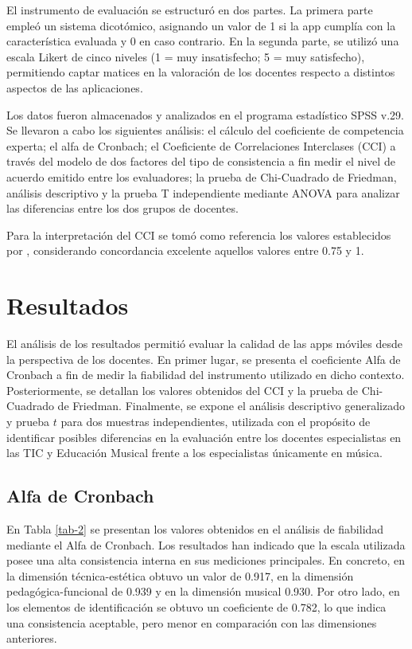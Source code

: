 \documentclass[spanish]{textolivre}
\begin{document}
El instrumento de evaluación se estructuró en dos partes. La primera parte empleó un sistema dicotómico, asignando un valor de 1 si la app cumplía con la característica evaluada y 0 en caso contrario. En la segunda parte, se utilizó una escala Likert de cinco niveles (1 = muy insatisfecho; 5 = muy satisfecho), permitiendo captar matices en la valoración de los docentes respecto a distintos aspectos de las aplicaciones.

Los datos fueron almacenados y analizados en el programa estadístico SPSS v.29. Se llevaron a cabo los siguientes análisis: el cálculo del coeficiente de competencia experta; el alfa de Cronbach; el Coeficiente de Correlaciones Interclases (CCI) a través del modelo de dos factores del tipo de consistencia a fin medir el nivel de acuerdo emitido entre los evaluadores; la prueba de Chi-Cuadrado de Friedman, análisis descriptivo y la prueba T independiente mediante ANOVA para analizar las diferencias entre los dos grupos de docentes.

Para la interpretación del CCI se tomó como referencia los valores establecidos por \textcite{martinez-perez2023}, considerando concordancia excelente aquellos valores entre 0.75 y 1.

\section{Resultados}\label{sec-resultados}
El análisis de los resultados permitió evaluar la calidad de las apps móviles desde la perspectiva de los docentes. En primer lugar, se presenta el coeficiente Alfa de Cronbach a fin de medir la fiabilidad del instrumento utilizado en dicho contexto. Posteriormente, se detallan los valores obtenidos del CCI y la prueba de Chi-Cuadrado de Friedman. Finalmente, se expone el análisis descriptivo generalizado y prueba $t$ para dos muestras independientes, utilizada con el propósito de identificar posibles diferencias en la evaluación entre los docentes especialistas en las TIC y Educación Musical frente a los especialistas únicamente en música.

\subsection{Alfa de Cronbach}\label{sec-3_1}
En Tabla \ref{tab-2} se presentan los valores obtenidos en el análisis de fiabilidad mediante el Alfa de Cronbach. Los resultados han indicado que la escala utilizada posee una alta consistencia interna en sus mediciones principales. En concreto, en la dimensión técnica-estética obtuvo un valor de 0.917, en la dimensión pedagógica-funcional de 0.939 y en la dimensión musical 0.930. Por otro lado, en los elementos de identificación se obtuvo un coeficiente de 0.782, lo que indica una consistencia aceptable, pero menor en comparación con las dimensiones anteriores. 
\end{document}

